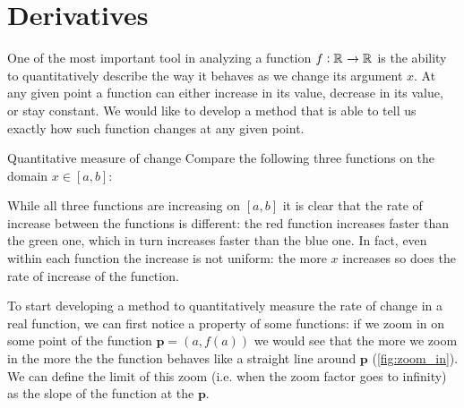 \section{Derivatives}
One of the most important tool in analyzing a function $f:\mathbb{R}^{}\to\mathbb{R}^{}$ is the ability to quantitatively describe the way it behaves as we change its argument $x$. At any given point a function can either increase in its value, decrease in its value, or stay constant. We would like to develop a method that is able to tell us exactly how such function changes at any given point.

\begin{example}{Quantitative measure of change}{}
  Compare the following three functions on the domain $x\in[a,b]$:

  \centering

  \flushleft
  While all three functions are increasing on $[a,b]$ it is clear that the rate of increase between the functions is different: the red function increases faster than the green one, which in turn increases faster than the blue one. In fact, even within each function the increase is not uniform: the more $x$ increases so does the rate of increase of the function.
\end{example}

To start developing a method to quantitatively measure the rate of change in a real function, we can first notice a property of some functions: if we zoom in on some point of the function $\bm{p}=\left(a,f\left(a\right)\right)$ we would see that the more we zoom in the more the the function behaves like a straight line around $\bm{p}$ (\autoref{fig:zoom_in}). We can define the limit of this zoom (i.e. when the zoom factor goes to infinity) as the slope of the function at the $\bm{p}$.

